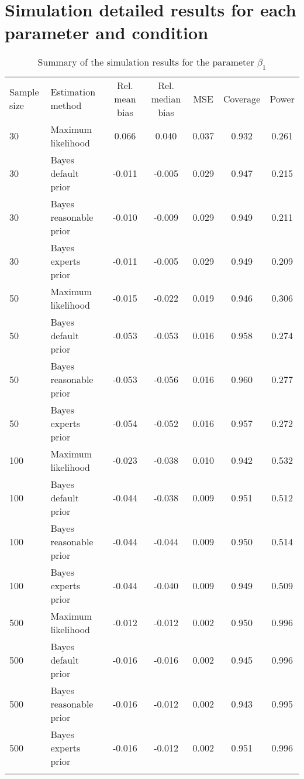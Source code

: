 \documentclass[graybox]{svmult}
\begin{document}
\section*{Simulation detailed results for each parameter and condition}

\vspace{-1em}
\begin{table}
\caption{Summary of the simulation results for the parameter $\beta_1$}
\label{tab:}
\begin{tabular}[t]{llccccc}
\hline\noalign{\smallskip}
Sample size & Estimation method & Rel. mean bias & Rel. median bias & MSE & Coverage & Power\\
\noalign{\smallskip}\svhline\noalign{\smallskip}
30 & Maximum likelihood & 0.066 & 0.040 & 0.037 & 0.932 & 0.261\\
30 & Bayes default prior & -0.011 & -0.005 & 0.029 & 0.947 & 0.215\\
30 & Bayes reasonable prior & -0.010 & -0.009 & 0.029 & 0.949 & 0.211\\
30 & Bayes experts prior & -0.011 & -0.005 & 0.029 & 0.949 & 0.209\\
\noalign{\smallskip}
50 & Maximum likelihood & -0.015 & -0.022 & 0.019 & 0.946 & 0.306\\
50 & Bayes default prior & -0.053 & -0.053 & 0.016 & 0.958 & 0.274\\
50 & Bayes reasonable prior & -0.053 & -0.056 & 0.016 & 0.960 & 0.277\\
50 & Bayes experts prior & -0.054 & -0.052 & 0.016 & 0.957 & 0.272\\
\noalign{\smallskip}
100 & Maximum likelihood & -0.023 & -0.038 & 0.010 & 0.942 & 0.532\\
100 & Bayes default prior & -0.044 & -0.038 & 0.009 & 0.951 & 0.512\\
100 & Bayes reasonable prior & -0.044 & -0.044 & 0.009 & 0.950 & 0.514\\
100 & Bayes experts prior & -0.044 & -0.040 & 0.009 & 0.949 & 0.509\\
\noalign{\smallskip}
500 & Maximum likelihood & -0.012 & -0.012 & 0.002 & 0.950 & 0.996\\
500 & Bayes default prior & -0.016 & -0.016 & 0.002 & 0.945 & 0.996\\
500 & Bayes reasonable prior & -0.016 & -0.012 & 0.002 & 0.943 & 0.995\\
500 & Bayes experts prior & -0.016 & -0.012 & 0.002 & 0.951 & 0.996\\
\noalign{\smallskip}\hline\noalign{\smallskip}
\multicolumn{7}{l}{\textit{Note: } Rel. = Relative; MSE = Mean Square Error.}\\
\end{tabular}
\end{table}
\end{document}
